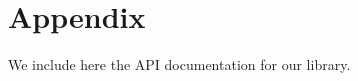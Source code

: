\chapter{Appendix}
\label{appendix:api-doc}

We include here the API documentation for our library.
